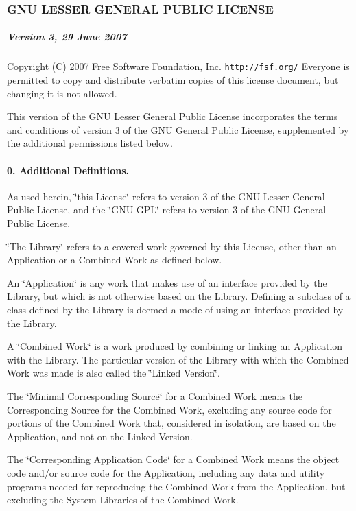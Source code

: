 \subsubsection*{G\-N\-U L\-E\-S\-S\-E\-R G\-E\-N\-E\-R\-A\-L P\-U\-B\-L\-I\-C L\-I\-C\-E\-N\-S\-E}

\subparagraph*{Version 3, 29 June 2007}

Copyright (C) 2007 Free Software Foundation, Inc. \href{http://fsf.org/}{\tt http\-://fsf.\-org/} Everyone is permitted to copy and distribute verbatim copies of this license document, but changing it is not allowed.

This version of the G\-N\-U Lesser General Public License incorporates the terms and conditions of version 3 of the G\-N\-U General Public License, supplemented by the additional permissions listed below.

\paragraph*{0. Additional Definitions.}

As used herein, \char`\"{}this License\char`\"{} refers to version 3 of the G\-N\-U Lesser General Public License, and the \char`\"{}\-G\-N\-U G\-P\-L\char`\"{} refers to version 3 of the G\-N\-U General Public License.

\char`\"{}\-The Library\char`\"{} refers to a covered work governed by this License, other than an Application or a Combined Work as defined below.

An \char`\"{}\-Application\char`\"{} is any work that makes use of an interface provided by the Library, but which is not otherwise based on the Library. Defining a subclass of a class defined by the Library is deemed a mode of using an interface provided by the Library.

A \char`\"{}\-Combined Work\char`\"{} is a work produced by combining or linking an Application with the Library. The particular version of the Library with which the Combined Work was made is also called the \char`\"{}\-Linked
\-Version\char`\"{}.

The \char`\"{}\-Minimal Corresponding Source\char`\"{} for a Combined Work means the Corresponding Source for the Combined Work, excluding any source code for portions of the Combined Work that, considered in isolation, are based on the Application, and not on the Linked Version.

The \char`\"{}\-Corresponding Application Code\char`\"{} for a Combined Work means the object code and/or source code for the Application, including any data and utility programs needed for reproducing the Combined Work from the Application, but excluding the System Libraries of the Combined Work.

